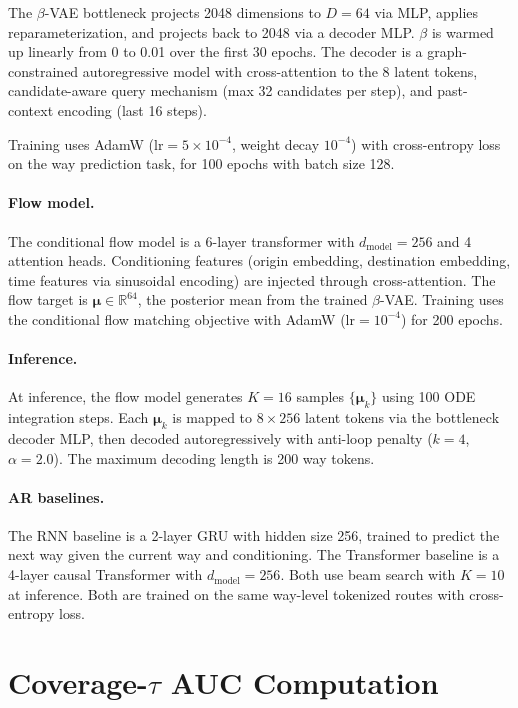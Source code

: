 The $\beta$-VAE bottleneck projects 2048 dimensions to $D = 64$ via MLP, applies reparameterization, and projects back to 2048 via a decoder MLP.
$\beta$ is warmed up linearly from 0 to 0.01 over the first 30 epochs.
The decoder is a graph-constrained autoregressive model with cross-attention to the 8 latent tokens, candidate-aware query mechanism (max 32 candidates per step), and past-context encoding (last 16 steps).

Training uses AdamW ($\mathrm{lr} = 5 \times 10^{-4}$, weight decay $10^{-4}$) with cross-entropy loss on the way prediction task, for 100 epochs with batch size 128.

\paragraph{Flow model.}
The conditional flow model is a 6-layer transformer with $d_{\mathrm{model}} = 256$ and 4 attention heads.
Conditioning features (origin embedding, destination embedding, time features via sinusoidal encoding) are injected through cross-attention.
The flow target is $\boldsymbol{\mu} \in \mathbb{R}^{64}$, the posterior mean from the trained $\beta$-VAE.
Training uses the conditional flow matching objective \citep{lipman2023flow} with AdamW ($\mathrm{lr} = 10^{-4}$) for 200 epochs.

\paragraph{Inference.}
At inference, the flow model generates $K = 16$ samples $\{\boldsymbol{\mu}_k\}$ using 100 ODE integration steps.
Each $\boldsymbol{\mu}_k$ is mapped to $8 \times 256$ latent tokens via the bottleneck decoder MLP, then decoded autoregressively with anti-loop penalty ($k = 4$, $\alpha = 2.0$).
The maximum decoding length is 200 way tokens.

\paragraph{AR baselines.}
The RNN baseline is a 2-layer GRU with hidden size 256, trained to predict the next way given the current way and conditioning.
The Transformer baseline is a 4-layer causal Transformer with $d_{\mathrm{model}} = 256$.
Both use beam search with $K = 10$ at inference.
Both are trained on the same way-level tokenized routes with cross-entropy loss.

\section{Coverage-$\tau$ AUC Computation}
\label{app:covauc}

